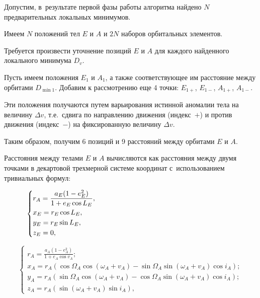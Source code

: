 Допустим, в~результате первой фазы работы алгоритма найдено $N$ предварительных локальных минимумов. 

Имеем $N$ положений тел $E$ и $A$ и $2N$ наборов орбитальных элементов. 

Требуется произвести уточнение позиций $E$ и $A$ для каждого найденного локального минимума $D_v$.



Пусть имеем положения $E_1$ и $A_1$, а также соответствующее им расстояние между орбитами $D_{\min1}$. Добавим к рассмотрению еще 4 точки: $E_{1+}$, $E_{1-}$, $A_{1+}$, $A_{1-}$. 

Эти положения получаются путем варьирования истинной аномалии тела на величину $\Delta v$, т.е.~сдвига по направлению движения (индекс~${+}$) и против движения (индекс~{$-$}) на фиксированную величину $\Delta v$. 

Таким образом, получим 6 позиций и 9 расстояний между орбитами $E$ и $A$. 



Расстояния между телами $E$ и $A$ вычисляются как расстояния между двумя точками в декартовой трехмерной системе координат с~использованием тривиальных формул:



\begin{equation}

\begin{cases}

\displaystyle	r_{A} = \frac{a_E(1-e^2_E)}{1+e_E \cos L_E}, \\[2mm]

	x_{E} = r_{E}\cos L_E, \\

	y_{E} = r_{E}\sin L_E, \\

	z_{E} = 0,

\end{cases} \hspace{6.6cm}

\end{equation}



\begin{equation}

\begin{cases}

\displaystyle	r_{A} = \frac{a_A(1-e^2_A)}{1+e_A \cos v_A}; \\[2mm]

	x_{A} = r_{A}(\cos\Omega_A \cos(\omega_A + v_A) - \sin\Omega_A \sin(\omega_A + v_A) \cos i_A); \\

	y_{A} = r_{A}(\sin\Omega_A \cos(\omega_A + v_A) - \cos\Omega_A \sin(\omega_A + v_A) \cos i_A); \\

	z_{A} = r_{A}(\sin(\omega_A + v_A) \sin i_A),

\end{cases}

\end{equation}



